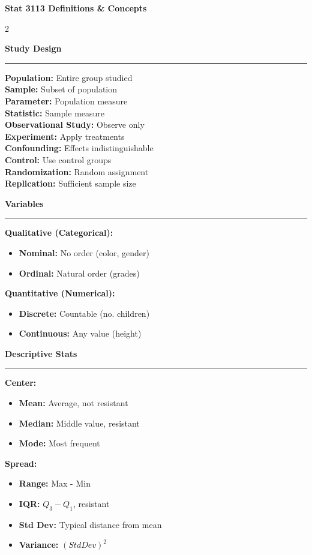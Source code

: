 \documentclass[10pt, letterpaper]{article}
\newcommand{\sectionhead}[1]{%
    \begin{center}%
    \large\bfseries#1%
    \end{center}%
    \vspace{-2mm}%
    \hrule%
    \vspace{2mm}%
}
\begin{document}
\begin{center}
    {\LARGE\bfseries Stat 3113 Definitions \& Concepts}
\end{center}
\vspace{1mm}

\begin{multicols}{2}
\small

\sectionhead{Study Design}

\textbf{Population:} Entire group studied \\
\textbf{Sample:} Subset of population \\
\textbf{Parameter:} Population measure \\
\textbf{Statistic:} Sample measure \\
\textbf{Observational Study:} Observe only \\
\textbf{Experiment:} Apply treatments \\
\textbf{Confounding:} Effects indistinguishable \\
\textbf{Control:} Use control groups \\
\textbf{Randomization:} Random assignment \\
\textbf{Replication:} Sufficient sample size

\sectionhead{Variables}

\textbf{Qualitative (Categorical):}
\begin{itemize}
    \item \textbf{Nominal:} No order (color, gender)
    \item \textbf{Ordinal:} Natural order (grades)
\end{itemize}

\textbf{Quantitative (Numerical):}
\begin{itemize}
    \item \textbf{Discrete:} Countable (no. children)
    \item \textbf{Continuous:} Any value (height)
\end{itemize}

\sectionhead{Descriptive Stats}

\textbf{Center:}
\begin{itemize}
    \item \textbf{Mean:} Average, not resistant
    \item \textbf{Median:} Middle value, resistant
    \item \textbf{Mode:} Most frequent
\end{itemize}

\textbf{Spread:}
\begin{itemize}
    \item \textbf{Range:} Max - Min
    \item \textbf{IQR:} $Q_3 - Q_1$, resistant
    \item \textbf{Std Dev:} Typical distance from mean
    \item \textbf{Variance:} $(Std Dev)^2$
\end{itemize}


\end{multicols}
\end{document}
